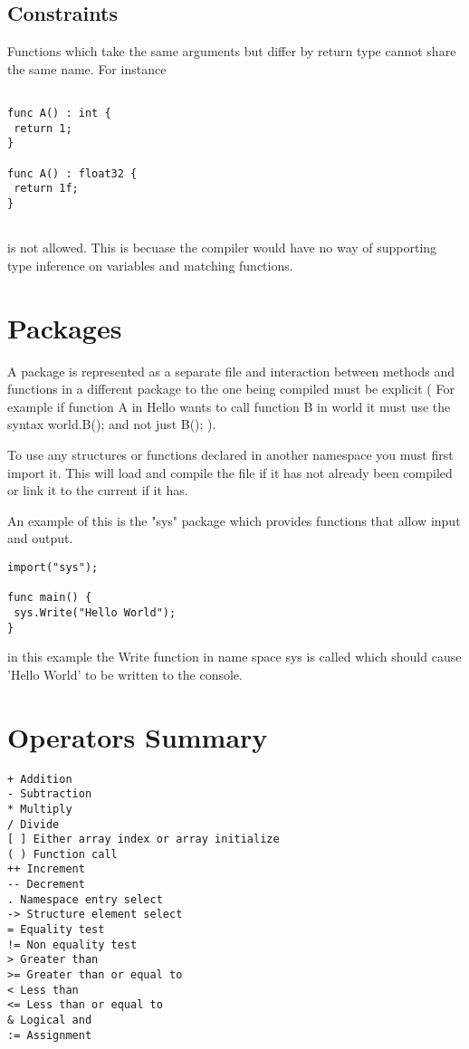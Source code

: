 \documentclass[]{final_report}
\begin{document}
\subsection{Constraints}

Functions which take the same arguments but differ by return type cannot share the same name. For instance

\begin{verbatim}

func A() : int {
 return 1;
}

func A() : float32 {
 return 1f;
}
 
\end{verbatim}

is not allowed. This is becuase the compiler would have no way of supporting type inference on variables and matching functions.

\section{Packages}

A package is represented as a separate file and interaction between methods and functions in a different package to the one being compiled must be explicit ( For example if function A in Hello wants to call function B in world it must use the syntax world.B(); and not just B(); ).

To use any structures or functions declared in another namespace you must first import it. This will load and compile the file if it has not already been compiled or link it to the current if it has.

An example of this is the "sys" package which provides functions that allow input and output.

\begin{verbatim}
import("sys");

func main() {
 sys.Write("Hello World");
}
\end{verbatim}

in this example the Write function in name space sys is called which should cause 'Hello World' to be written to the console.

\section{Operators Summary}

\begin {verbatim}
+ Addition
- Subtraction
* Multiply
/ Divide
[ ] Either array index or array initialize
( ) Function call
++ Increment
-- Decrement
. Namespace entry select
-> Structure element select
= Equality test
!= Non equality test
> Greater than
>= Greater than or equal to
< Less than
<= Less than or equal to
& Logical and 
:= Assignment
\end{verbatim}
\end{document}
